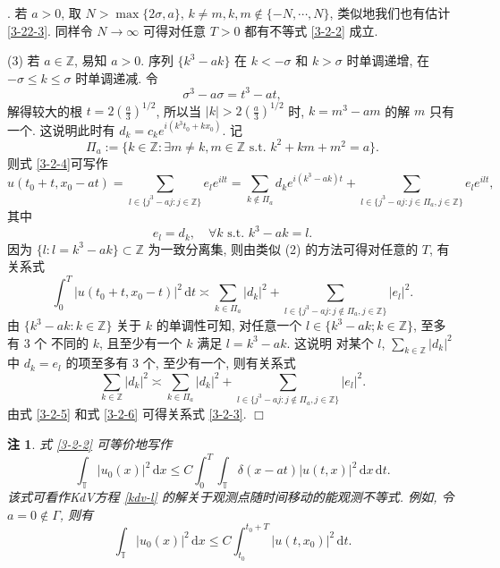 \documentclass[master]{cugthesis}
\newcommand\Z{\ensuremath{\mathbb{Z}}}
\newcommand\T{\ensuremath{\mathbb{T}}}
\renewcommand\d{\ensuremath{\,\mathrm{d}}}
\newenvironment{proof}{{\noindent\itshape 证明}.}{\hfill $\Box$\par}
\newtheorem{remark}{注}
\begin{document}
\begin{proof}
    若 $a>0$, 取 $N>\max\lbrace 2\sigma, a\rbrace$, $k\neq m, k,m\notin \lbrace-N,\cdots, N\rbrace$, 类似地我们也有估计 \eqref{3-22-3}. 同样令 $N\to \infty$ 可得对任意 $T>0$ 都有不等式 \eqref{3-2-2} 成立. 
    
    (3) 若 $a\in \Z$, 易知 $a>0$. 序列 $\lbrace k^3-ak\rbrace$ 在 $k<-\sigma$ 和 $k>\sigma$ 时单调递增, 在 $-\sigma\le k\le \sigma$ 时单调递减. 令
    \begin{equation*}
        \sigma^3-a\sigma=t^3-at,
    \end{equation*}
    解得较大的根 $t=2\left(\frac{a}{3}\right)^{1 /2}$,
    所以当 $|k|> 2\left(\frac{a}{3}\right)^{1 /2}$ 时, $k=m^3-am$ 的解 $m$ 只有一个. 这说明此时有 $d_k=c_k e^{i(k^3t_0+kx_0)}$. 记
    \begin{equation}\label{pia}
        \Pi_a:=\lbrace k\in \Z : \exists m\neq k,m\in \Z \text{ s.t. } k^2+km+m^2=a \rbrace.
    \end{equation}
    则式 \eqref{3-2-4}可写作
    \begin{equation*}
        u(t_0+t,x_0-at)=\sum_{l\in \lbrace j^3-aj:j\in \Z  \rbrace}e_l e^{ilt}=\sum_{k\notin \Pi_a} d_k e^{i(k^3-ak)t}+\sum_{l\in \lbrace j^3-aj: j\in \Pi_a, j\in \Z\rbrace} e_l e^{ilt},
    \end{equation*}  
    其中
    \begin{equation*}
        e_l=d_k, \quad \forall k \text{ s.t. } k^3-ak=l.
    \end{equation*}
    因为 $\lbrace l: l=k^3-ak \rbrace \subset \Z $ 为一致分离集, 则由类似 (2) 的方法可得对任意的 $T$, 有关系式
    \begin{equation}\label{3-2-5}
        \int_0^T|u(t_0+t,x_0-t)|^2\d t\asymp \sum_{k\in \Pi_a}|d_k|^2+\sum_{l\in \lbrace j^3-aj: j \notin \Pi_a,j\in\Z\rbrace }|e_l|^2.
    \end{equation}
    由 $\lbrace k^3-ak:k\in \Z\rbrace$ 关于 $k$ 的单调性可知, 对任意一个 $l\in \lbrace k^3-ak; k\in \Z\rbrace$, 至多有 3 个 不同的 $k$, 且至少有一个 $k$  满足 $l=k^3-ak$. 这说明 对某个 $l$, $\sum_{k\in\Z} |d_k|^2$ 中 $d_k=e_l$ 的项至多有 3 个, 至少有一个, 则有关系式
    \begin{equation}\label{3-2-6}
        \sum_{k\in \Z}|d_k|^2\asymp  \sum_{k\in \Pi_a}|d_k|^2+\sum_{l\in \lbrace j^3-aj: j \notin \Pi_a,j\in\Z\rbrace }|e_l|^2.
    \end{equation}
    由式 \eqref{3-2-5} 和式 \eqref{3-2-6} 可得关系式 \eqref{3-2-3}.
    \end{proof}
    
    \begin{remark}
    式 \eqref{3-2-2} 可等价地写作
    \begin{equation*}
        \int_{\T}|u_0(x)|^2\d x\le C\int_0^T\int_{\T}\delta(x-at)|u(t,x)|^2\d x\d t.
    \end{equation*}
    该式可看作KdV方程 \eqref{kdv-l} 的解关于观测点随时间移动的能观测不等式. 例如, 令 $a=0\notin \Gamma$, 则有
    \begin{equation*}
        \int_{\T}|u_0(x)|^2\d x\le C\int_{t_0}^{t_0+T} |u(t,x_0)|^2\d t.
    \end{equation*}
    \end{remark}
    
\end{document}
